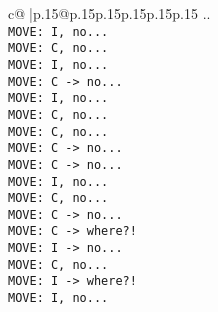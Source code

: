 \documentclass{article}
\begin{document}
{\begin{supertabular}{c@{$\;$}|p{.15\linewidth}@{}p{.15\linewidth}p{.15\linewidth}p{.15\linewidth}p{.15\linewidth}p{.15\linewidth}}
{{{..\\ \tt  MOVE: I, no...\\ \tt  MOVE: C, no...\\ \tt  MOVE: I, no...\\ \tt  MOVE: C -> no...\\ \tt  MOVE: I, no...\\ \tt  MOVE: C, no...\\ \tt  MOVE: C, no...\\ \tt  MOVE: C -> no...\\ \tt  MOVE: C -> no...\\ \tt  MOVE: I, no...\\ \tt  MOVE: C, no...\\ \tt  MOVE: C -> no...\\ \tt  MOVE: C -> where?!\\ \tt  MOVE: I -> no...\\ \tt  MOVE: C, no...\\ \tt  MOVE: I -> where?!\\ \tt  MOVE: I, no...\\ \tt }}}
\end{supertabular}}
\end{document}
